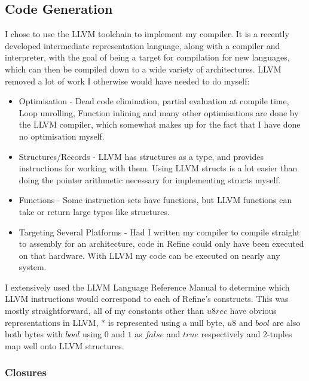\subsection{Code Generation}

I chose to use the LLVM toolchain to implement my compiler.
It is a recently developed intermediate representation language, along with a compiler and interpreter,
with the goal of being a target for compilation for new languages, which can then be compiled down to
a wide variety of architectures.
LLVM removed a lot of work I otherwise would have needed to do myself:
\begin{itemize}
    \item Optimisation -
    Dead code elimination,
    partial evaluation at compile time,
    Loop unrolling,
    Function inlining
    and many other optimisations are done by the LLVM compiler, which somewhat makes up for the fact that
    I have done no optimisation myself.
    \item Structures/Records -
    LLVM has structures as a type, and provides instructions for working with them.
    Using LLVM structs is a lot easier than doing the pointer arithmetic necessary for implementing
    structs myself.
    \item Functions -
    Some instruction sets have functions, but LLVM functions can take or return large types like
    structures.
    \item Targeting Several Platforms -
    Had I written my compiler to compile straight to assembly for an architecture, code in Refine could
    only have been executed on that hardware.
    With LLVM my code can be executed on nearly any system.
\end{itemize}
I extensively used the LLVM Language Reference Manual \cite{llvm} to determine which LLVM instructions
would correspond to each of Refine's constructs.
This was mostly straightforward, all of my constants other than $u8rec$ have obvious representations
in LLVM, $\ast$ is represented using a null byte, $u8$ and $bool$ are also both bytes with $bool$ using
$0$ and $1$ as $false$ and $true$ respectively and 2-tuples map well onto LLVM structures.

\subsubsection{Closures}

